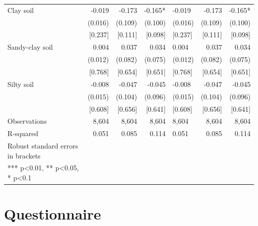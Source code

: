 \documentclass[
]{article}
\begin{document}
\begin{ThreePartTable}
\begin{longtable}[t]{lrrrlrr}
Clay soil & -0.019 & -0.173 & -0.165* & -0.019 & -0.173 & -0.165*\\
 & (0.016) & (0.109) & (0.100) & (0.016) & (0.109) & (0.100)\\
 & {}[0.237] & {}[0.111] & {}[0.098] & {}[0.237] & {}[0.111] & {}[0.098]\\
Sandy-clay soil & 0.004 & 0.037 & 0.034 & 0.004 & 0.037 & 0.034\\
 & (0.012) & (0.082) & (0.075) & (0.012) & (0.082) & (0.075)\\
 & {}[0.768] & {}[0.654] & {}[0.651] & {}[0.768] & {}[0.654] & {}[0.651]\\
Silty soil & -0.008 & -0.047 & -0.045 & -0.008 & -0.047 & -0.045\\
 & (0.015) & (0.104) & (0.096) & (0.015) & (0.104) & (0.096)\\
 & {}[0.608] & {}[0.656] & {}[0.641] & {}[0.608] & {}[0.656] & {}[0.641]\\
Observations & 8,604 & 8,604 & 8,604 & 8,604 & 8,604 & 8,604\\
R-squared & 0.051 & 0.085 & 0.114 & 0.051 & 0.085 & 0.114\\
Robust standard errors in brackets &  &  &  &  &  & \\
*** p<0.01, ** p<0.05, * p<0.1 &  &  &  &  &  & \\*
\end{longtable}
\end{ThreePartTable}
\endgroup{}
\newpage

\hypertarget{questionnaire}{%
\section{Questionnaire}\label{questionnaire}}


\end{document}

